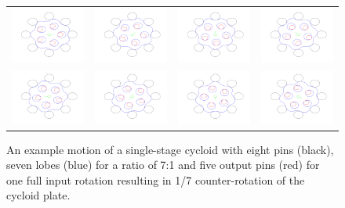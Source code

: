 \begin{figure}[t]
   \centering
   \begin{tabular}{cccc}
     \includegraphics[width=0.24\linewidth]{fig/single_0} &
     \includegraphics[width=0.24\linewidth]{fig/single_1} &
     \includegraphics[width=0.24\linewidth]{fig/single_2} &
     \includegraphics[width=0.24\linewidth]{fig/single_3} \\
     \includegraphics[width=0.24\linewidth]{fig/single_4} &
     \includegraphics[width=0.24\linewidth]{fig/single_5} &
     \includegraphics[width=0.24\linewidth]{fig/single_6} &
     \includegraphics[width=0.24\linewidth]{fig/single_7} \\
   \end{tabular}
   \caption{An example motion of a single-stage cycloid with eight pins (black), seven lobes (blue) for a ratio of 7:1 and five output pins (red) for one full input rotation resulting in 1/7 counter-rotation of the cycloid plate.}
   \label{fig:single_motion}
\end{figure}

